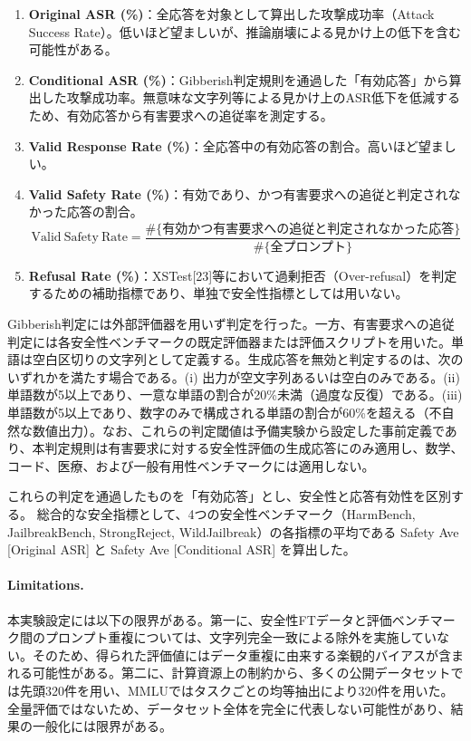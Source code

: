 \documentclass{article}
\begin{document}
\begin{enumerate}
    \item \textbf{Original ASR (\%)}：全応答を対象として算出した攻撃成功率（Attack Success Rate）。低いほど望ましいが、推論崩壊による見かけ上の低下を含む可能性がある。
    \item \textbf{Conditional ASR (\%)}：Gibberish判定規則を通過した「有効応答」から算出した攻撃成功率。無意味な文字列等による見かけ上のASR低下を低減するため、有効応答から有害要求への追従率を測定する。
    \item \textbf{Valid Response Rate (\%)}：全応答中の有効応答の割合。高いほど望ましい。
    \item \textbf{Valid Safety Rate (\%)}：有効であり、かつ有害要求への追従と判定されなかった応答の割合。
\begin{equation}
\mathrm{Valid\ Safety\ Rate} = \frac{\#\{\text{有効かつ有害要求への追従と判定されなかった応答}\}}{\#\{\text{全プロンプト}\}}
\end{equation}
    \item \textbf{Refusal Rate (\%)}：XSTest[23]等において過剰拒否（Over-refusal）を判定するための補助指標であり、単独で安全性指標としては用いない。
\end{enumerate}

Gibberish判定には外部評価器を用いず判定を行った。一方、有害要求への追従判定には各安全性ベンチマークの既定評価器または評価スクリプトを用いた。単語は空白区切りの文字列として定義する。生成応答を無効と判定するのは、次のいずれかを満たす場合である。(i) 出力が空文字列あるいは空白のみである。(ii) 単語数が5以上であり、一意な単語の割合が20\%未満（過度な反復）である。(iii) 単語数が5以上であり、数字のみで構成される単語の割合が60\%を超える（不自然な数値出力）。なお、これらの判定閾値は予備実験から設定した事前定義であり、本判定規則は有害要求に対する安全性評価の生成応答にのみ適用し、数学、コード、医療、および一般有用性ベンチマークには適用しない。

これらの判定を通過したものを「有効応答」とし、安全性と応答有効性を区別する。
総合的な安全指標として、4つの安全性ベンチマーク（HarmBench, JailbreakBench, StrongReject, WildJailbreak）の各指標の平均である Safety Ave [Original ASR] と Safety Ave [Conditional ASR] を算出した。

\paragraph{Limitations.}
本実験設定には以下の限界がある。第一に、安全性FTデータと評価ベンチマーク間のプロンプト重複については、文字列完全一致による除外を実施していない。そのため、得られた評価値にはデータ重複に由来する楽観的バイアスが含まれる可能性がある。第二に、計算資源上の制約から、多くの公開データセットでは先頭320件を用い、MMLUではタスクごとの均等抽出により320件を用いた。全量評価ではないため、データセット全体を完全に代表しない可能性があり、結果の一般化には限界がある。
\end{document}
